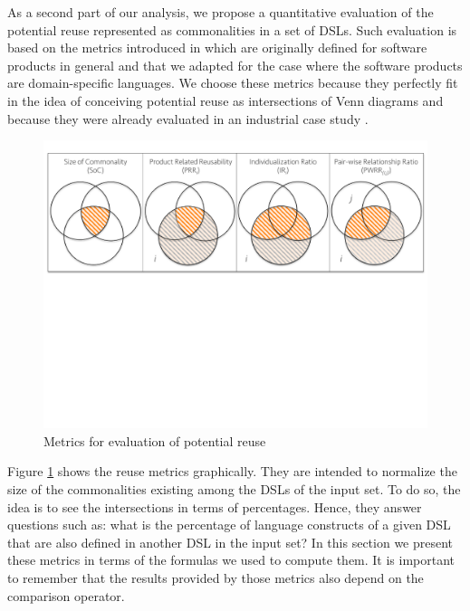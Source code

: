 As a second part of our analysis, we propose a quantitative evaluation of the potential reuse represented as commonalities in a set of DSLs. Such evaluation is based on the metrics introduced in \cite{Berger:2014} which are originally defined for software products in general and that we adapted for the case where the software products are domain-specific languages. We choose these metrics because they perfectly fit in the idea of conceiving potential reuse as intersections of Venn diagrams and because they were already evaluated in an industrial case study \cite{Berger:126283}.

\begin{figure}
\centering
\includegraphics[width=1\linewidth]{images/metrics.pdf}
\caption{Metrics for evaluation of potential reuse}
\label{fig:metrics}
\end{figure}

Figure \ref{fig:metrics} shows the reuse metrics graphically. They are intended to normalize the size of the commonalities existing among the DSLs of the input set. To do so, the idea is to see the intersections in terms of percentages. Hence, they answer questions such as: what is the percentage of language constructs of a given DSL that are also defined in another DSL in the input set? In this section we present these metrics in terms of the formulas we used to compute them. It is important to remember that the results provided by those metrics also depend on the comparison operator.

